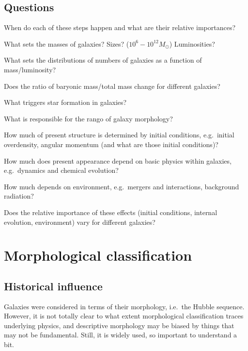 \documentclass[12pt]{article}
\begin{document}
\subsection*{Questions}
\begin{itemize*}
    \item When do each of these steps happen and what are their
        relative importances?
    \item What sets the masses of galaxies? Sizes?
        ($10^6-10^{12}M_\odot$) Luminosities?
    \item What sets the distributions of numbers of galaxies as a
        function of mass/luminosity?
    \item Does the ratio of baryonic mass/total mass change for
        different galaxies?
    \item What triggers star formation in galaxies?
    \item What is responsible for the rango of galaxy morphology?
    \item How much of present structure is determined by initial
        conditions, e.g.\ initial overdensity, angular momentum (and what
        are those initial conditions)?
    \item How much does present appearance depend on basic physics
        within galaxies, e.g.\ dynamics and chemical evolution?
    \item How much depends on environment, e.g.\ mergers and
        interactions, background radiation?
    \item Does the relative importance of these effects (initial
        conditions, internal evolution, environment) vary for different
        galaxies?
\end{itemize*}


\section*{Morphological classification}
\subsection*{Historical influence}
Galaxies were considered in terms of their morphology, i.e.\ the Hubble sequence.
However, it is not totally clear to what extent morphological classification
traces underlying physics, and descriptive morphology may be biased by things
that may not be fundamental. Still, it is widely used, so important to understand
a bit.
\end{document}
